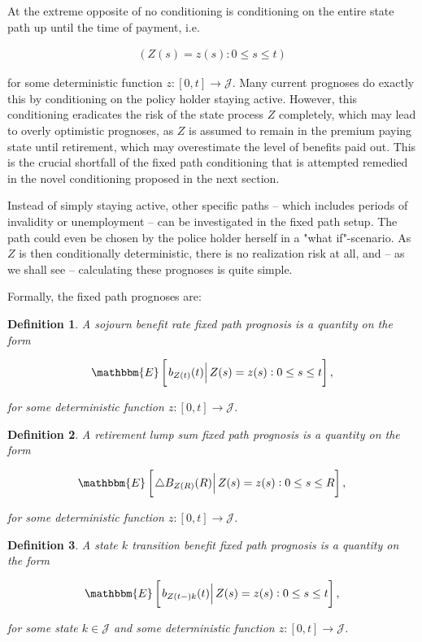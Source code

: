 \documentclass{book}
\newcommand{\1}[1]{\mathbbm{1}_{\left\lbrace #1 \right\rbrace}}
\newcommand{\econd}[2][def]{\mathbbm{E} \left[ \left. #1 \right| #2 \right]}
\theoremstyle{break}
\newtheorem{definition}{Definition}%
\theoremstyle{remark}
\numberwithin{equation}{section}
\begin{document}
At the extreme opposite of no conditioning is conditioning on the entire state path up until the time of payment, i.e.

\begin{align*}
\left( Z(s) = z(s) : 0 \leq s \leq t \right)
\end{align*}

for some deterministic function $z: [0,t] \to \mathcal{J}$. Many current prognoses do exactly this by conditioning on the policy holder staying active. However, this conditioning eradicates the risk of the state process $Z$ completely, which may lead to overly optimistic prognoses, as $Z$ is assumed to remain in the premium paying state until retirement, which may overestimate the level of benefits paid out. This is the crucial shortfall of the fixed path conditioning that is attempted remedied in the novel conditioning proposed in the next section.

Instead of simply staying active, other specific paths -- which includes periods of invalidity or unemployment -- can be investigated in the fixed path setup. The path could even be chosen by the police holder herself in a "what if"-scenario. As $Z$ is then conditionally deterministic, there is no realization risk at all, and -- as we shall see -- calculating these prognoses is quite simple.

Formally, the fixed path prognoses are:

\begin{definition}
	A sojourn benefit rate fixed path prognosis is a quantity on the form
	
	\begin{gather*}
		\econd[b_{Z(t)}(t)]{Z(s) = z(s) : 0 \leq s \leq t},
	\end{gather*}
	
	for some deterministic function $z: [0,t] \to \mathcal{J}$.
\end{definition}

\begin{definition}
	A retirement lump sum fixed path prognosis is a quantity on the form
	
	\begin{gather*}
		\econd[\triangle B_{Z(R)}(R)]{Z(s) = z(s) : 0 \leq s \leq R},
	\end{gather*}
	
	for some deterministic function $z: [0,t] \to \mathcal{J}$.
\end{definition}

\begin{definition}
	A state $k$ transition benefit fixed path prognosis is a quantity on the form
	
	\begin{gather*}
		\econd[b_{Z(t-)k}(t)]{ Z(s) = z(s) : 0 \leq s \leq t},
	\end{gather*}
	
	for some state $k \in \mathcal{J}$ and some deterministic function $z: [0,t] \to \mathcal{J}$.
\end{definition}
\end{document}
